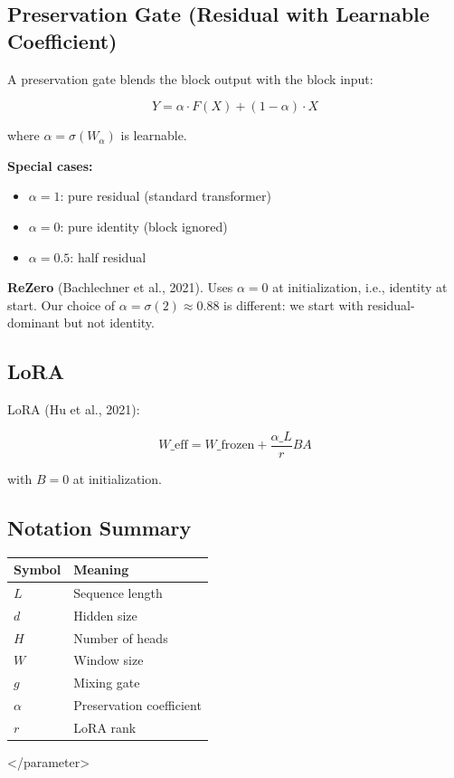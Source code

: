 \subsection{Preservation Gate (Residual with Learnable Coefficient)}

A preservation gate blends the block output with the block input:

\[
Y = \alpha \cdot F(X) + (1 - \alpha) \cdot X
\tag{3.5}
\]

where $\alpha = \sigma(W_\alpha)$ is learnable.

\textbf{Special cases:}
\begin{itemize}
\item $\alpha = 1$: pure residual (standard transformer)
\item $\alpha = 0$: pure identity (block ignored)
\item $\alpha = 0.5$: half residual

\end{itemize}
\textbf{ReZero} (Bachlechner et al., 2021). Uses $\alpha = 0$ at initialization, 
i.e., identity at start. Our choice of $\alpha = \sigma(2) \approx 0.88$ is 
different: we start with residual-dominant but not identity.

\subsection{LoRA}

LoRA (Hu et al., 2021):

\[
W\_\text{eff} = W\_\text{frozen} + \frac{\alpha\_L}{r} BA
\tag{3.6}
\]

with $B = 0$ at initialization.

\subsection{Notation Summary}

\begin{table}[H]
\centering
\small
\begin{tabular}{ll}
\toprule
\textbf{Symbol} & \textbf{Meaning} \\
\midrule
$L$ & Sequence length \\
$d$ & Hidden size \\
$H$ & Number of heads \\
$W$ & Window size \\
$g$ & Mixing gate \\
$\alpha$ & Preservation coefficient \\
$r$ & LoRA rank \\
\bottomrule
\end{tabular}
\end{table}
\textless{}/parameter\textgreater{}

